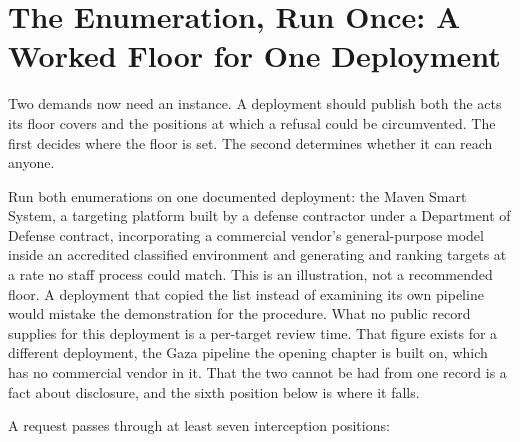 \section{The Enumeration, Run Once: A Worked Floor for One Deployment}
\label{sec:3.6}
Two demands now need an instance. A deployment should publish both the acts its floor covers and the positions at which a refusal could be circumvented. The first decides where the floor is set. The second determines whether it can reach anyone.

Run both enumerations on one documented deployment: the Maven Smart System, a targeting platform built by a defense contractor under a Department of Defense contract, incorporating a commercial vendor's general-purpose model inside an accredited classified environment and generating and ranking targets at a rate no staff process could match. This is an illustration, not a recommended floor. A deployment that copied the list instead of examining its own pipeline would mistake the demonstration for the procedure. What no public record supplies for this deployment is a per-target review time. That figure exists for a different deployment, the Gaza pipeline the opening chapter is built on, which has no commercial vendor in it. That the two cannot be had from one record is a fact about disclosure, and the sixth position below is where it falls.


A request passes through at least seven interception positions:

